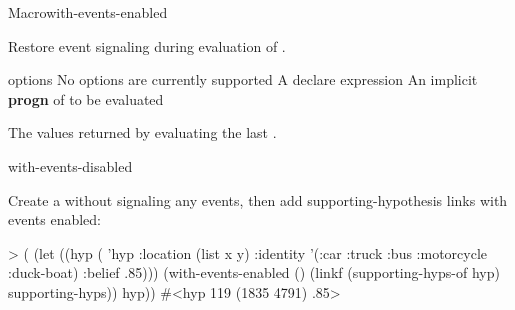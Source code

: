 \documentclass[10pt,twoside,english,pdftex]{article}
\begin{document}
\begin{functiondoc}{Macro}{with-events-enabled}%
  {\code{(}\superstar{}\code{)}
    \superstar{}
    \superstar{}
    \returns{} \superstar}
%
%
  
\fnsyntax

\fnpurpose Restore event signaling during evaluation of .

\fnpackage {}

\fnmodule {}

\fnargs
\begin{args}{options}
\arg[option] No options are currently supported
\arg[declaration] A declare expression
\arg[forms] An implicit \textbf{progn} of  to be evaluated
\end{args}

\fnreturns The values returned by evaluating the last .

\begin{alsos}{with-events-disabled}
\end{alsos}

\fnexample
{}%
Create a  without signaling any events, then add
supporting-hypothesis links with events enabled:
\begin{example}
> (
     (let ((hyp ( 'hyp 
                    :location (list x y)
                    :identity '(:car :truck :bus :motorcycle :duck-boat)
                    :belief .85)))
        (with-events-enabled ()
           (linkf (supporting-hyps-of hyp) supporting-hyps))
        hyp))
#<hyp 119 (1835 4791) .85>
\end{example}

\end{functiondoc}

\end{document}
